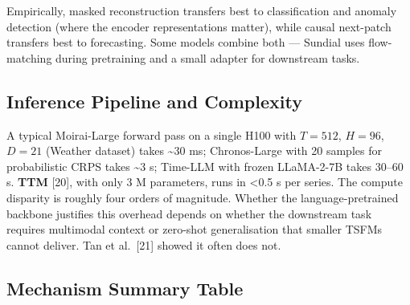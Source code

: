 \documentclass{article}
\begin{document}
Empirically, masked reconstruction transfers best to classification and anomaly detection (where the encoder representations matter), while causal next-patch transfers best to forecasting. Some models combine both --- Sundial uses flow-matching during pretraining and a small adapter for downstream tasks.

\subsection{Inference Pipeline and Complexity}\label{inference-pipeline-and-complexity}

A typical Moirai-Large forward pass on a single H100 with \(T=512\), \(H=96\), \(D=21\) (Weather dataset) takes \textasciitilde30 ms; Chronos-Large with 20 samples for probabilistic CRPS takes \textasciitilde3 s; Time-LLM with frozen LLaMA-2-7B takes 30--60 s. \textbf{TTM} {[}20{]}, with only 3 M parameters, runs in \textless0.5 s per series. The compute disparity is roughly four orders of magnitude. Whether the language-pretrained backbone justifies this overhead depends on whether the downstream task requires multimodal context or zero-shot generalisation that smaller TSFMs cannot deliver. Tan et al.~{[}21{]} showed it often does not.

\subsection{Mechanism Summary Table}\label{mechanism-summary-table}
\end{document}
